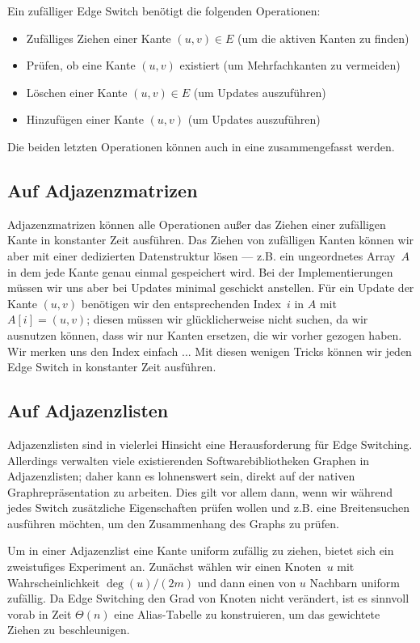 Ein zufälliger Edge Switch benötigt die folgenden Operationen:
\begin{itemize}
    \item Zufälliges Ziehen einer Kante $(u,v) \in E$ (um die aktiven Kanten zu finden)
    \item Prüfen, ob eine Kante $(u, v)$ existiert (um Mehrfachkanten zu vermeiden)
    \item Löschen einer Kante $(u, v) \in E$ (um Updates auszuführen)
    \item Hinzufügen einer Kante $(u, v)$ (um Updates auszuführen)
\end{itemize}

Die beiden letzten Operationen können auch in eine zusammengefasst werden.

\subsection{Auf Adjazenzmatrizen}
Adjazenzmatrizen können alle Operationen außer das Ziehen einer zufälligen Kante in konstanter Zeit ausführen.
Das Ziehen von zufälligen Kanten können wir aber mit einer dedizierten Datenstruktur lösen ---
z.B. ein ungeordnetes Array~$A$ in dem jede Kante genau einmal gespeichert wird.
Bei der Implementierungen müssen wir uns aber bei Updates minimal geschickt anstellen.
Für ein Update der Kante $(u,v)$ benötigen wir den entsprechenden Index~$i$ in $A$ mit $A[i] = (u,v)$;
diesen müssen wir glücklicherweise nicht suchen, da wir ausnutzen können, dass wir nur Kanten ersetzen, die wir vorher gezogen haben.
Wir merken uns den Index einfach ...
Mit diesen wenigen Tricks können wir jeden Edge Switch in konstanter Zeit ausführen.

\subsection{Auf Adjazenzlisten}
Adjazenzlisten sind in vielerlei Hinsicht eine Herausforderung für Edge Switching.
Allerdings verwalten viele existierenden Softwarebibliotheken Graphen in Adjazenzlisten; daher kann es lohnenswert sein, direkt auf der nativen Graphrepräsentation zu arbeiten.
Dies gilt vor allem dann, wenn wir während jedes Switch zusätzliche Eigenschaften prüfen wollen und z.B. eine Breitensuchen ausführen möchten, um den Zusammenhang des Graphs zu prüfen.

Um in einer Adjazenzlist eine Kante uniform zufällig zu ziehen, bietet sich ein zweistufiges Experiment an.
Zunächst wählen wir einen Knoten~$u$ mit Wahrscheinlichkeit $\deg(u) / (2m)$ und dann einen von $u$ Nachbarn uniform zufällig.
Da Edge Switching den Grad von Knoten nicht verändert, ist es sinnvoll vorab in Zeit $\Theta(n)$ eine Alias-Tabelle zu konstruieren, um das gewichtete Ziehen zu beschleunigen.

